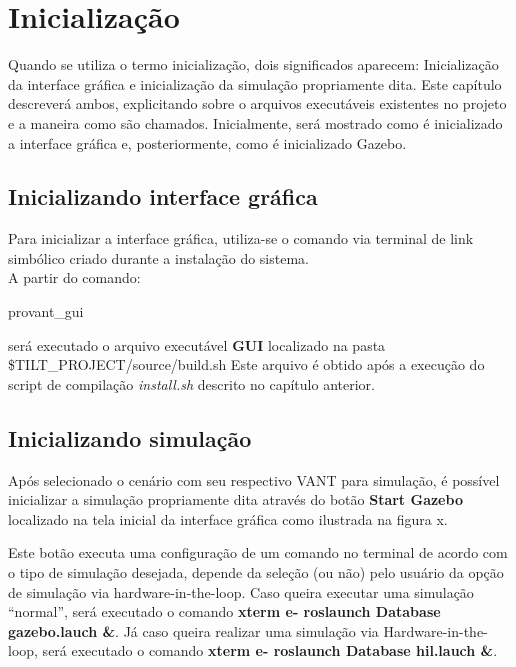 \chapter{Inicialização}

Quando se utiliza o termo inicialização, dois significados aparecem: Inicialização da interface gráfica e inicialização da simulação propriamente dita. Este capítulo descreverá ambos, explicitando sobre o arquivos executáveis existentes no projeto e a maneira como são chamados. Inicialmente, será mostrado como é inicializado a interface gráfica e, posteriormente, como é inicializado  Gazebo.

\section{Inicializando interface gráfica}

Para inicializar a interface gráfica, utiliza-se o comando via terminal de link simbólico criado durante a instalação do sistema. \\

\noindent A partir do comando:

\begin{bashcode}
	provant_gui
\end{bashcode}

\noindent será executado o arquivo executável \textbf{GUI} localizado na pasta \$TILT\_PROJECT/source/build.sh Este arquivo é obtido após a execução do script de compilação \textit{install.sh} descrito no capítulo anterior.

\section{Inicializando simulação}

Após selecionado o cenário com seu respectivo VANT para simulação, é possível inicializar a simulação propriamente dita através do botão \textbf{Start Gazebo} localizado na tela inicial da interface gráfica como ilustrada na figura x. 

Este botão executa uma configuração de um comando no terminal de acordo com o tipo de simulação desejada, depende da seleção (ou não) pelo usuário da opção de simulação via hardware-in-the-loop. Caso queira executar uma simulação ``normal'', será executado  o comando \textbf{xterm e- roslaunch Database gazebo.lauch \&}. Já caso queira realizar uma simulação via Hardware-in-the-loop, será executado o comando \textbf{xterm e- roslaunch Database hil.lauch \&}. 

